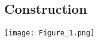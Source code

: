 \documentclass[10pt,a4paper]{report}
\begin{document}
\begin{multicols}{2}
 \section{Construction}
 	\begin{center}
  \texttt{[image: Figure\_1.png]}
  	\end{center}
\vspace{3cm}
\end{multicols}
\end{document}
